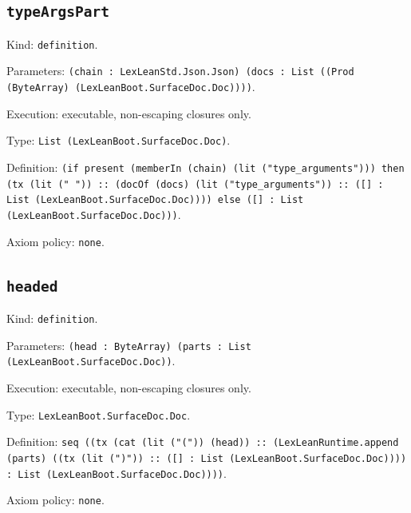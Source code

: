 \documentclass[11pt]{article}
\begin{document}
\subsection*{\texttt{typeArgsPart}}
\noindent Kind: \texttt{definition}.\par
\noindent Parameters: \texttt{(chain : LexLeanStd.Json.Json) (docs : List ((Prod (ByteArray) (LexLeanBoot.SurfaceDoc.Doc))))}.\par
\noindent Execution: executable, non-escaping closures only.\par
\noindent Type: \texttt{List (LexLeanBoot.SurfaceDoc.Doc)}.\par
\noindent Definition: \texttt{(if present (memberIn (chain) (lit ("type\_arguments"))) then (tx (lit (" ")) :: (docOf (docs) (lit ("type\_arguments")) :: ([] : List (LexLeanBoot.SurfaceDoc.Doc)))) else ([] : List (LexLeanBoot.SurfaceDoc.Doc)))}.\par
\noindent Axiom policy: \texttt{none}.\par
\subsection*{\texttt{headed}}
\noindent Kind: \texttt{definition}.\par
\noindent Parameters: \texttt{(head : ByteArray) (parts : List (LexLeanBoot.SurfaceDoc.Doc))}.\par
\noindent Execution: executable, non-escaping closures only.\par
\noindent Type: \texttt{LexLeanBoot.SurfaceDoc.Doc}.\par
\noindent Definition: \texttt{seq ((tx (cat (lit ("(")) (head)) :: (LexLeanRuntime.append (parts) ((tx (lit (")")) :: ([] : List (LexLeanBoot.SurfaceDoc.Doc)))) : List (LexLeanBoot.SurfaceDoc.Doc))))}.\par
\noindent Axiom policy: \texttt{none}.\par
\end{document}
